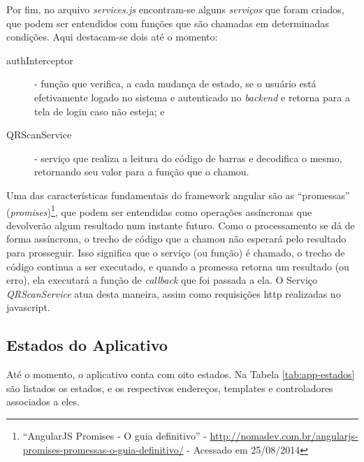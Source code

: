 Por fim, no arquivo \textit{services.js} encontram-se alguns \textit{serviços} que foram criados, que podem ser entendidos com funções que são chamadas em determinadas condições. Aqui destacam-se dois até o momento:
\begin{description}
    \item[authInterceptor] - função que verifica, a cada mudança de estado, se o usuário está efetivamente logado no sistema e autenticado no \textit{backend} e retorna para a tela de login caso não esteja; e
    \item[QRScanService] - serviço que realiza a leitura do código de barras e decodifica o mesmo, retornando seu valor para a função que o chamou.
\end{description}

Uma das características fundamentais do framework \gls{angular} são as ``promessas'' (\textit{promises})\footnote{``AngularJS Promises - O guia definitivo'' - \url{http://nomadev.com.br/angularjs-promises-promessas-o-guia-definitivo/} - Acessado em 25/08/2014}, que podem ser entendidas como operações assíncronas que devolverão algum resultado num instante futuro. Como o processamento se dá de forma assíncrona, o trecho de código que a chamou não esperará pelo resultado para prosseguir. Isso significa que o serviço (ou função) é chamado, o trecho de código continua a ser executado, e quando a promessa retorna um resultado (ou erro), ela executará a função de \textit{callback} que foi passada a ela. O Serviço \textit{QRScanService} atua desta maneira, assim como requisições \gls{http} realizadas no javascript.

\subsection{Estados do Aplicativo}
Até o momento, o aplicativo conta com oito estados. Na Tabela \ref{tab:app-estados} são listados os estados, e os respectivos endereços, templates e controladores associados a eles.


